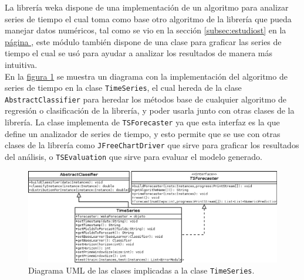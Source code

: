 La librería weka dispone de una implementación de un algoritmo para analizar series de tiempo el cual toma como base otro algoritmo de la librería que pueda manejar datos numéricos, tal como se vio en la sección \ref{subsec:estudiost} en la \hyperref[subsec:estudiost]{página \pageref{subsec:estudiost}}, este módulo también dispone de una clase para graficar las series de tiempo el cual se usó para ayudar a analizar los resultados de manera más intuitiva.\\
En la \hyperref[fig:diagramaUml]{figura \ref{fig:diagramaUml}} 
se muestra un diagrama con la implementación del algoritmo de series de tiempo en la clase \texttt{TimeSeries}, el cual hereda de la clase \texttt{AbstractClassifier} para heredar los métodos base de cualquier algoritmo de regresión o clasificación de la librería, y poder usarla junto con otras clases de la librería. La clase implementa de \texttt{TSForecaster} ya que esta interfaz es la que define un analizador de series de tiempo, y esto permite que se use con otras clases de la librería como \texttt{JFreeChartDriver} que sirve para graficar los resultados del análisis, o \texttt{TSEvaluation} que sirve para evaluar el modelo generado.
\begin{figure}[!b]%
	\centering
	\includegraphics[width=15cm]{img/diagramaUml.png}
	\caption{Diagrama UML de las clases implicadas a la clase \texttt{TimeSeries}. }
	\label{fig:diagramaUml}
\end{figure}

